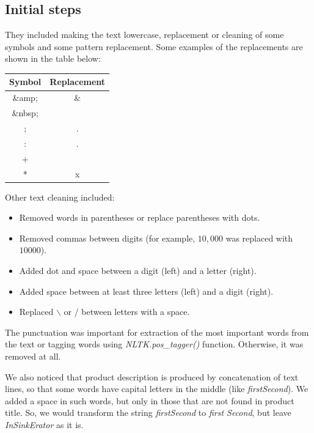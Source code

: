 \documentclass[12pt]{article}
\begin{document}
\subsection{Initial steps}
They included making the text lowercase, replacement or cleaning of some symbols and some pattern replacement.
Some examples of the replacements are shown in the table below:

\begin{tabular}{|c|c|}
  \hline
  Symbol & Replacement \\ \hline
  \&amp; & \& \\ \hline
 \&nbsp; &  \\ \hline
  ; & . \\ \hline
: & . \\ \hline
+ &  \\ \hline
* &  x \\ \hline
\end{tabular}

Other text cleaning included:
\begin{itemize}
\item Removed words in parentheses or replace parentheses with dots.
\item Removed commas between digits (for example, $10,000$ was replaced with $10000$).
\item Added dot and space between a digit (left) and a letter (right).
\item Added space between at least three letters (left) and a digit (right).
\item Replaced  $\backslash$ or / between letters with a space.
\end{itemize}

The punctuation was important for extraction of the most important words from the text or tagging words using \emph{NLTK.pos\_tagger()} function. Otherwise, it was removed at all.

We also noticed that product description is produced by concatenation of text lines, so that some words have capital letters in the middle (like \emph{firstSecond}). We added a space in such words, but only in those that are not found in product title. So, we would transform the string \emph{firstSecond} to \emph{first Second}, but leave \emph{InSinkErator} as it is.
\end{document}
